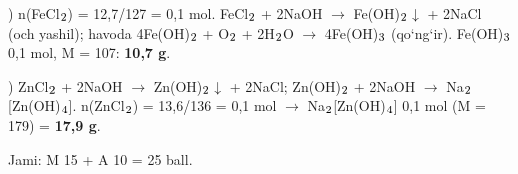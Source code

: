 \documentclass[11pt,a4paper]{article}
\renewcommand{\textsubscript}[1]{\ensuremath{_{\text{\fontsize{8}{8}\selectfont #1}}}}
\begin{document}
) n(FeCl\textsubscript{2}) = 12,7/127 = 0,1 mol. FeCl\textsubscript{2} + 2NaOH $\to$ Fe(OH)\textsubscript{2}$\downarrow$ + 2NaCl (och yashil); havoda 4Fe(OH)\textsubscript{2} + O\textsubscript{2} + 2H\textsubscript{2}O $\to$ 4Fe(OH)\textsubscript{3} (qo`ng`ir). Fe(OH)\textsubscript{3} 0,1 mol, M = 107: \textbf{10,7 g}.\par
{}) ZnCl\textsubscript{2} + 2NaOH $\to$ Zn(OH)\textsubscript{2}$\downarrow$ + 2NaCl; Zn(OH)\textsubscript{2} + 2NaOH $\to$ Na\textsubscript{2}[Zn(OH)\textsubscript{4}]. n(ZnCl\textsubscript{2}) = 13,6/136 = 0,1 mol $\to$ Na\textsubscript{2}[Zn(OH)\textsubscript{4}] 0,1 mol (M = 179) = \textbf{17,9 g}.\par
\noindent Jami: M 15 + A 10 = 25 ball.\par
\end{document}

